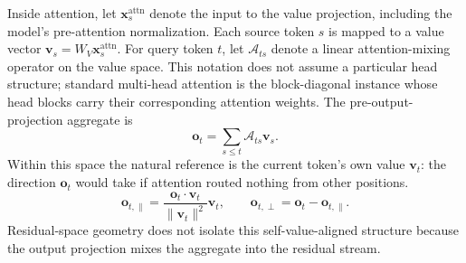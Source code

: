 Inside attention, let $\mathbf{x}^{\mathrm{attn}}_s$ denote the input to the
value projection, including the model's pre-attention normalization. Each
source token $s$ is mapped to a value vector
$\mathbf{v}_s=W_V\mathbf{x}^{\mathrm{attn}}_s$. For query token $t$, let
$\mathcal{A}_{ts}$ denote a linear attention-mixing operator on the value
space. This notation does not assume a particular head structure; standard
multi-head attention is the block-diagonal instance whose head blocks carry
their corresponding attention weights.
The pre-output-projection aggregate is
\begin{equation}
  \mathbf{o}_t=\sum_{s\le t} \mathcal{A}_{ts}\mathbf{v}_s .
  \label{eq:value-aggregation}
\end{equation}
Within this space the natural reference is the current token's own value
$\mathbf{v}_t$: the direction $\mathbf{o}_t$ would take if attention routed
nothing from other positions.
\begin{equation}
  \mathbf{o}_{t,\parallel}
    = \frac{\mathbf{o}_t \cdot \mathbf{v}_t}{\|\mathbf{v}_t\|^2}\mathbf{v}_t,
  \qquad
  \mathbf{o}_{t,\perp}=\mathbf{o}_t-\mathbf{o}_{t,\parallel}.
  \label{eq:value-space-decomp}
\end{equation}
Residual-space geometry does not isolate this self-value-aligned structure
because the output projection mixes the aggregate into the residual stream.


